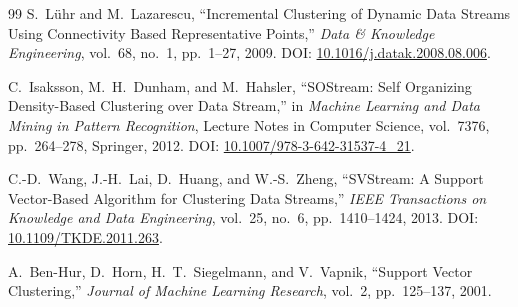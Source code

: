 \begin{thebibliography}{99}
S.~L{\"u}hr and M.~Lazarescu,
\newblock ``Incremental Clustering of Dynamic Data Streams Using Connectivity Based Representative Points,''
\newblock \emph{Data \& Knowledge Engineering}, vol.~68, no.~1, pp.~1--27, 2009.
\newblock DOI: \href{https://doi.org/10.1016/j.datak.2008.08.006}{10.1016/j.datak.2008.08.006}.

C.~Isaksson, M.~H.~Dunham, and M.~Hahsler,
\newblock ``SOStream: Self Organizing Density-Based Clustering over Data Stream,''
\newblock in \emph{Machine Learning and Data Mining in Pattern Recognition}, Lecture Notes in Computer Science, vol.~7376, pp.~264--278, Springer, 2012.
\newblock DOI: \href{https://doi.org/10.1007/978-3-642-31537-4_21}{10.1007/978-3-642-31537-4\_21}.

C.-D.~Wang, J.-H.~Lai, D.~Huang, and W.-S.~Zheng,
\newblock ``SVStream: A Support Vector-Based Algorithm for Clustering Data Streams,''
\newblock \emph{IEEE Transactions on Knowledge and Data Engineering}, vol.~25, no.~6, pp.~1410--1424, 2013.
\newblock DOI: \href{https://doi.org/10.1109/TKDE.2011.263}{10.1109/TKDE.2011.263}.

A.~Ben-Hur, D.~Horn, H.~T.~Siegelmann, and V.~Vapnik,
\newblock ``Support Vector Clustering,''
\newblock \emph{Journal of Machine Learning Research}, vol.~2, pp.~125--137, 2001.
\end{thebibliography}
